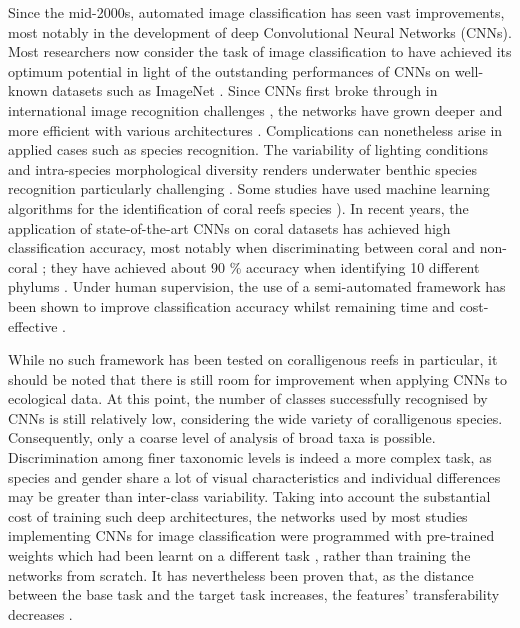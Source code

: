 Since the mid-2000s, automated image classification has seen vast improvements, most notably in the development of deep Convolutional Neural Networks (CNNs). Most researchers now consider the task of image classification to have achieved its optimum potential \citep{rawat_deep_2017} in light of the outstanding performances of CNNs on well-known datasets such as ImageNet \citep{deng_imagenet:_2009}. Since CNNs first broke through in international image recognition challenges \citep{krizhevsky_imagenet_2012}, the networks have grown deeper and more efficient with various architectures \citep{he_deep_2016, huang_densely_2017, szegedy_going_2015}. Complications can nonetheless arise in applied cases such as species recognition. The variability of lighting conditions and intra-species morphological diversity renders underwater benthic species recognition particularly challenging \citep{beijbom_automated_2012}. Some studies have used machine learning algorithms for the identification of coral reefs species \citep{beijbom_automated_2012, marcos_classification_2005}). In recent years, the application of state-of-the-art CNNs on coral datasets has achieved high classification accuracy, most notably when discriminating between coral and non-coral \citep{manderson_robotic_2017, williams_leveraging_2019}; they have achieved about 90 \% accuracy when identifying 10 different phylums \citep{king_comparison_2018}. Under human supervision, the use of a semi-automated framework has been shown to improve classification accuracy whilst remaining time and cost-effective \citep{beijbom_towards_2015, geifman_selective_2017}.

While no such framework has been tested on coralligenous reefs in particular, it should be noted that there is still room for improvement when applying CNNs to ecological data. At this point, the number of classes successfully recognised by CNNs is still relatively low, considering the wide variety of coralligenous species. Consequently, only a coarse level of analysis of broad taxa is possible. Discrimination among finer taxonomic levels is indeed a more complex task, as species and gender share a lot of visual characteristics and individual differences may be greater than inter-class variability. Taking into account the substantial cost of training such deep architectures, the networks used by most studies implementing CNNs for image classification were programmed with pre-trained weights which had been learnt on a different task \citep{king_comparison_2018, mahmood_deep_2017}, rather than training the networks from scratch. It has nevertheless been proven that, as the distance between the base task and the target task increases, the features’ transferability decreases \citep{yosinski_how_2014}. 

